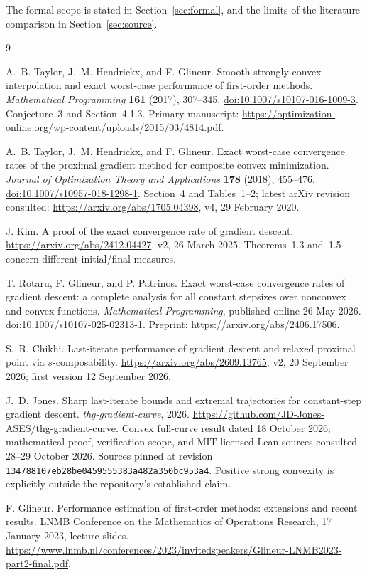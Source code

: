 \documentclass[11pt]{article}
\numberwithin{equation}{section}
\theoremstyle{remark}
\begin{document}
The formal scope is stated in Section~\ref{sec:formal}, and the limits of the
literature comparison in Section~\ref{sec:source}.

\begin{thebibliography}{9}

A.~B. Taylor, J.~M. Hendrickx, and F. Glineur.
\newblock Smooth strongly convex interpolation and exact worst-case
performance of first-order methods.
\newblock \emph{Mathematical Programming} \textbf{161} (2017), 307--345.
\newblock \href{https://doi.org/10.1007/s10107-016-1009-3}{doi:10.1007/s10107-016-1009-3}.
\newblock Conjecture~3 and Section~4.1.3.
\newblock Primary manuscript:
\url{https://optimization-online.org/wp-content/uploads/2015/03/4814.pdf}.

A.~B. Taylor, J.~M. Hendrickx, and F. Glineur.
\newblock Exact worst-case convergence rates of the proximal gradient
method for composite convex minimization.
\newblock \emph{Journal of Optimization Theory and Applications}
\textbf{178} (2018), 455--476.
\newblock \href{https://doi.org/10.1007/s10957-018-1298-1}{doi:10.1007/s10957-018-1298-1}.
\newblock Section~4 and Tables~1--2; latest arXiv revision consulted:
\url{https://arxiv.org/abs/1705.04398}, v4, 29 February 2020.

J. Kim.
\newblock A proof of the exact convergence rate of gradient descent.
\newblock \url{https://arxiv.org/abs/2412.04427}, v2, 26 March 2025.
\newblock Theorems~1.3 and~1.5 concern different initial/final measures.

T. Rotaru, F. Glineur, and P. Patrinos.
\newblock Exact worst-case convergence rates of gradient descent:
a complete analysis for all constant stepsizes over nonconvex and
convex functions.
\newblock \emph{Mathematical Programming}, published online
26 May 2026.
\newblock \href{https://doi.org/10.1007/s10107-025-02313-1}{doi:10.1007/s10107-025-02313-1}.
\newblock Preprint: \url{https://arxiv.org/abs/2406.17506}.

S.~R. Chikhi.
\newblock Last-iterate performance of gradient descent and relaxed
proximal point via $s$-composability.
\newblock \url{https://arxiv.org/abs/2609.13765}, v2,
20 September 2026; first version 12 September 2026.

J.~D. Jones.
\newblock Sharp last-iterate bounds and extremal trajectories for
constant-step gradient descent.
\newblock \emph{thg-gradient-curve}, 2026.
\newblock \url{https://github.com/JD-Jones-ASES/thg-gradient-curve}.
\newblock Convex full-curve result dated 18 October 2026; mathematical
proof, verification scope, and MIT-licensed Lean sources consulted
28--29 October 2026. Sources pinned at revision
\texttt{134788107eb28be0459555383a482a350bc953a4}.
Positive strong convexity is explicitly outside the
repository's established claim.

F. Glineur.
\newblock Performance estimation of first-order methods: extensions
and recent results.
\newblock LNMB Conference on the Mathematics of Operations Research,
17 January 2023, lecture slides.
\newblock \url{https://www.lnmb.nl/conferences/2023/invitedspeakers/Glineur-LNMB2023-part2-final.pdf}.

\end{thebibliography}
\end{document}
